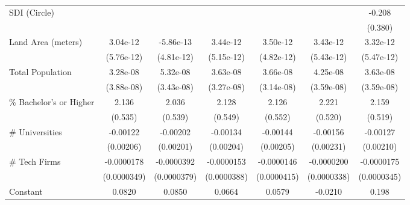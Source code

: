 {\begin{tabular}{l*{6}{c}}
SDI (Circle)        &                     &                     &                     &                     &                     &      -0.208         \\
                    &                     &                     &                     &                     &                     &     (0.380)         \\
\addlinespace
Land Area (meters)  &    3.04e-12         &   -5.86e-13         &    3.44e-12         &    3.50e-12         &    3.43e-12         &    3.32e-12         \\
                    &  (5.76e-12)         &  (4.81e-12)         &  (5.15e-12)         &  (4.82e-12)         &  (5.43e-12)         &  (5.47e-12)         \\
\addlinespace
Total Population    &    3.28e-08         &    5.32e-08         &    3.63e-08         &    3.66e-08         &    4.25e-08         &    3.63e-08         \\
                    &  (3.88e-08)         &  (3.43e-08)         &  (3.27e-08)         &  (3.14e-08)         &  (3.59e-08)         &  (3.59e-08)         \\
\addlinespace
\% Bachelor's or Higher&       2.136\sym{***}&       2.036\sym{***}&       2.128\sym{***}&       2.126\sym{***}&       2.221\sym{***}&       2.159\sym{***}\\
                    &     (0.535)         &     (0.539)         &     (0.549)         &     (0.552)         &     (0.520)         &     (0.519)         \\
\addlinespace
\# Universities     &    -0.00122         &    -0.00202         &    -0.00134         &    -0.00144         &    -0.00156         &    -0.00127         \\
                    &   (0.00206)         &   (0.00201)         &   (0.00204)         &   (0.00205)         &   (0.00231)         &   (0.00210)         \\
\addlinespace
\# Tech Firms       &  -0.0000178         &  -0.0000392         &  -0.0000153         &  -0.0000146         &  -0.0000200         &  -0.0000175         \\
                    & (0.0000349)         & (0.0000379)         & (0.0000388)         & (0.0000415)         & (0.0000338)         & (0.0000345)         \\
\addlinespace
Constant            &      0.0820         &      0.0850         &      0.0664         &      0.0579         &     -0.0210         &       0.198         \\

\end{tabular}}
